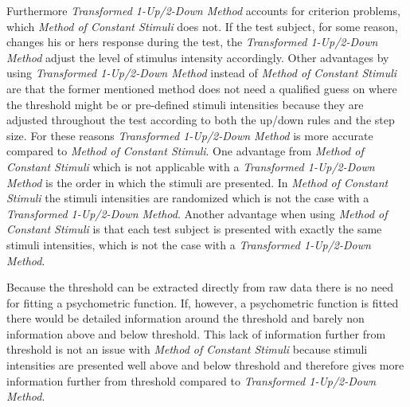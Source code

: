 Furthermore \textit{Transformed 1-Up/2-Down Method} accounts for criterion problems, which \textit{Method of Constant Stimuli} does not. If the test subject, for some reason, changes his or hers response during the test, the \textit{Transformed 1-Up/2-Down Method} adjust the level of stimulus intensity accordingly. Other advantages by using \textit{Transformed 1-Up/2-Down Method} instead of \textit{Method of Constant Stimuli} are that the former mentioned method does not need a qualified guess on where the threshold might be or pre-defined stimuli intensities because they are adjusted throughout the test according to both the up/down rules and the step size. For these reasons \textit{Transformed 1-Up/2-Down Method} is more accurate compared to \textit{Method of Constant Stimuli}.\blankline
%
One advantage from \textit{Method of Constant Stimuli} which is not applicable with a \textit{Transformed 1-Up/2-Down Method} is the order in which the stimuli are presented. In \textit{Method of Constant Stimuli} the stimuli intensities are randomized which is not the case with a \textit{Transformed 1-Up/2-Down Method}. Another advantage when using \textit{Method of Constant Stimuli} is that each test subject is presented with exactly the same stimuli intensities, which is not the case with a \textit{Transformed 1-Up/2-Down Method}. 

Because the threshold can be extracted directly from raw data there is no need for fitting a psychometric function. If, however, a psychometric function is fitted there would be detailed information around the threshold and barely non information above and below threshold. This lack of information further from threshold is not an issue with \textit{Method of Constant Stimuli} because stimuli intensities are presented well above and below threshold and therefore gives more information further from threshold compared to \textit{Transformed 1-Up/2-Down Method}.      

